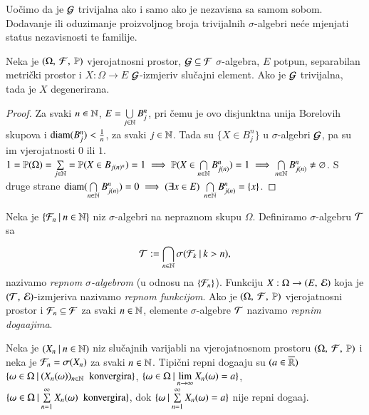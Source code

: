 Uo\v cimo da je $\mathcal{G}$ trivijalna ako i samo ako je nezavisna sa samom sobom.
Dodavanje ili oduzimanje proizvoljnog broja trivijalnih $\sigma$-algebri ne\' ce mjenjati status nezavisnosti te familije.

\begin{lm}  \label{lm:9.6}
    Neka je $(\Omega, \: \mathcal{F}, \: \mathbb{P})$ vjerojatnosni prostor, $\mathcal{G} \subseteq \mathcal{F}$ $\sigma$-algebra, $E$ potpun, separabilan metri\v cki prostor i $X : \Omega \to E$ $\mathcal{G}$-izmjeriv slu\v cajni element.
    Ako je $\mathcal{G}$ trivijalna, tada je $X$ degenerirana.
\end{lm}

\begin{proof}
    Za svaki $n \in \mathbb{N}$, $E = \bigcup\limits_{j \in \mathbb{N}}^{} B_j^n$, pri \v cemu je ovo disjunktna unija Borelovih skupova i $\mathrm{diam}(B_j^n) < \frac{1}{n}$, za svaki $j \in \mathbb{N}$.
    Tada su $\{ X \in B_j^n \}$ u $\sigma$-algebri $\mathcal{G}$, pa su im vjerojatnosti $0$ ili $1$.
    $1 = \mathbb{P}({\Omega}) = \sum\limits_{j \in \mathbb{N}}^{} = \mathbb{P}({X \in B_{j(n)^n}}) = 1 \implies \mathbb{P}({X \in \bigcap\limits_{n \in \mathbb{N}}^{} B_{j(n)}^n}) = 1 \implies \bigcap\limits_{n \in \mathbb{N}}^{} B_{j(n)}^n \neq \varnothing$.
    S druge strane $\mathrm{diam}(\bigcap\limits_{n \in \mathbb{N}}^{}B_{j(n)}^n) = 0 \implies (\exists x \in E) \; \bigcap\limits_{n \in \mathbb{N}}^{} B_{j(n)}^n = \{ x \}$.
\end{proof}

\begin{defn}    \label{defn:9.7}
    Neka je $\{{\mathcal{F}_n} \: | \: {n \in \mathbb{N}}\}$ niz $\sigma$-algebri na nepraznom skupu $\Omega$.
    Definiramo $\sigma$-algebru $\mathcal{T}$ sa
    \begin{equation*}
        \mathcal{T} := \bigcap\limits_{n \in \mathbb{N}}^{} \sigma({\mathcal{F}_k} \: | \: {k > n}),
    \end{equation*}
    nazivamo \emph{repnom $\sigma$-algebrom} (u odnosu na $\{ \mathcal{F}_n \}$).
    Funkciju $X : \Omega \to ({E}, \: {\mathcal{E}})$ koja je $({\mathcal{T}}, \: {\mathcal{E}})$-izmjeriva nazivamo \emph{repnom funkcijom}.
    Ako je $(\Omega, \: \mathcal{F}, \: \mathbb{P})$ vjerojatnosni prostor i $\mathcal{F}_n \subseteq \mathcal{F}$ za svaki $n \in \mathbb{N}$, elemente $\sigma$-algebre $\mathcal{T}$ nazivamo \emph{repnim doga\dj ajima}.
\end{defn}

\begin{pr}  \label{pr:9.8}
    Neka je $({X_n} \: | \: {n \in \mathbb{N}})$ niz slu\v cajnih varijabli na vjerojatnosnom prostoru $(\Omega, \: \mathcal{F}, \: \mathbb{P})$ i neka je $\mathcal{F}_n = \sigma({X_n})$ za svaki $n \in \mathbb{N}$.
    Tipi\v cni repni doga\dj aju su $(a \in \overline{\mathbb{R}})$ $\{{\omega \in \Omega} \: | \: {(X_n(\omega))_{n \in \mathbb{N}} \; \textnormal{ konvergira}}\}$, $\{{\omega \in \Omega} \: | \: {\lim\limits_{n \to \infty} X_n(\omega) = a}\}$, $\{{\omega \in \Omega} \: | \: {\sum\limits_{n = 1}^{\infty} X_n(\omega) \; \textnormal{ konvergira}}\}$, dok $\{{\omega} \: | \: {\sum\limits_{n = 1}^{\infty} X_n (\omega) = a}\}$ nije repni doga\dj aj.
\end{pr}

